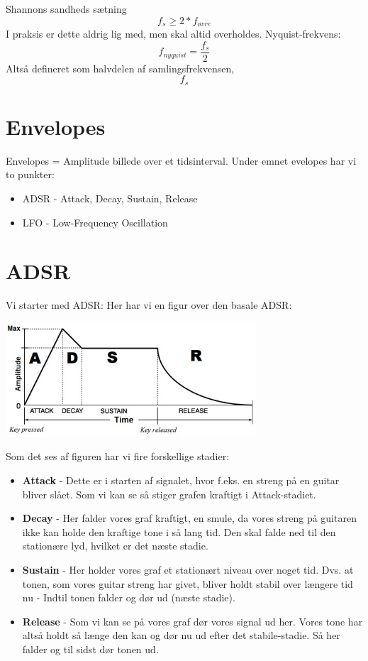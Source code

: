 \documentclass[12pt, letterpaper]{article}
\begin{document}
Shannons sandheds sætning
$$f_s\geq 2*f_{øvre}$$
I praksis er dette aldrig lig med, men skal altid overholdes. 
Nyquist-frekvens:
$$f_{nyquist} = \frac{f_s}{2}$$
Altså defineret som halvdelen af samlingsfrekvensen, $$f_s$$

\section{Envelopes}

Envelopes = Amplitude billede over et tidsinterval. 
Under emnet evelopes har vi to punkter: 
\begin{itemize}
\item ADSR - Attack, Decay, Sustain, Release
\item LFO - Low-Frequency Oscillation
\end{itemize}


\section{ADSR}


Vi starter med ADSR: 
Her har vi en figur over den basale ADSR: 

\begin{center}
\includegraphics[width=0.7\textwidth]{billeder/ADSR}
\end{center}

Som det ses af figuren har vi fire forskellige stadier: 
\begin{itemize}
\item \textbf{Attack} - Dette er i starten af signalet, hvor f.eks. en streng på en guitar bliver slået. Som vi kan se så stiger grafen kraftigt i Attack-stadiet. 
\item \textbf{Decay} - Her falder vores graf kraftigt, en smule, da vores streng på guitaren ikke kan holde den kraftige tone i så lang tid. Den skal falde ned til den stationære lyd, hvilket er det næste stadie.  
\item \textbf{Sustain} - Her holder vores graf et stationært niveau over noget tid. Dvs. at tonen, som vores guitar streng har givet, bliver holdt stabil over længere tid nu - Indtil tonen falder og dør ud (næste stadie). 
\item \textbf{Release} - Som vi kan se på vores graf dør vores signal ud her. Vores tone har altså holdt så længe den kan og dør nu ud efter det stabile-stadie. Så her falder og til sidst dør tonen ud. 
\end{itemize}
\newpage
\end{document}

